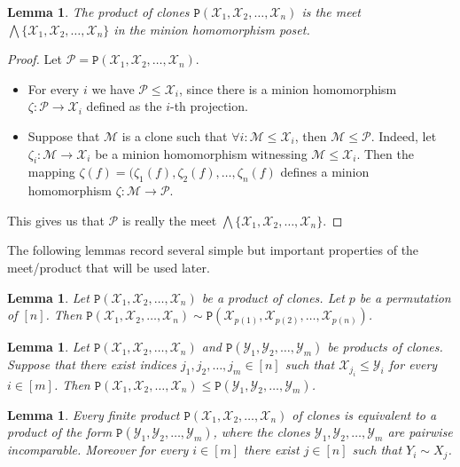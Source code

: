 \documentclass{amsart}
\numberwithin{equation}{section}
\theoremstyle{plain}
\newtheorem{lemma}[theorem]{Lemma}
\theoremstyle{definition}
\def\clone#1{\mathcal{#1}}
\def\C#1{{\mathtt{P}}(#1)}
\begin{document}
\begin{lemma}
The product of clones $\C{\clone{X}_1,\clone{X}_2,\dots, \clone{X}_n}$ is the meet $\bigwedge \{\clone{X}_1,\clone{X}_2,\dots,\clone{X}_n\}$ in the minion homomorphism poset. 
\end{lemma}
\begin{proof}
Let $\clone{P} = \C{\clone{X}_1,\clone{X}_2,\dots, \clone{X}_n}$.

\begin{itemize}
\item For every $i$ we have $\clone{P}\leq \clone{X}_i$, since there is a minion homomorphism $\zeta: \clone{P}\to \clone{X}_i$ defined as the $i$-th projection.
\item Suppose that $\clone{M}$ is a clone such that $\forall i:\clone{M} \leq \clone{X}_i$, then $\clone{M}\leq \clone{P}$. Indeed, let $\zeta_i:\clone{M}\to\clone{X}_i$ be a minion homomorphism witnessing $\clone{M}\leq \clone{X}_i$. Then the mapping $\zeta(f) = (\zeta_1(f), \zeta_2(f), \dots, \zeta_n(f)$ defines a minion homomorphism $\zeta:\clone{M}\to\clone{P}$.
\end{itemize}
This gives us that $\clone{P}$ is really the meet $\bigwedge \{\clone{X}_1,\clone{X}_2,\dots,\clone{X}_n\}$.
\end{proof}

The following lemmas record several simple but important properties of the meet/product that will be used later.

\begin{lemma}
\label{perm}
  Let $\C{\clone{X}_1,\clone{X}_2,\dots, \clone{X}_n}$ be a product of clones. Let $p$ be a permutation of $[n]$. Then $\C{\clone{X}_1,\clone{X}_2,\dots, \clone{X}_n}\sim\C{\clone{X}_{p(1)},\clone{X}_{p(2)},\dots,\clone{X}_{p(n)}}$.
\end{lemma}

\begin{lemma}
  \label{ineq-triv}
  Let $\C{\clone{X}_1,\clone{X}_2,\dots,\clone{X}_n}$ and $\C{\clone{Y}_1,\clone{Y}_2,\dots,\clone{Y}_m}$ be products of clones. Suppose that there exist indices $j_1,j_2,\dots,j_m\in[n]$ such that $\clone{X}_{j_i}\leq \clone{Y}_i$ for every $i\in[m]$. Then $\C{\clone{X}_1,\clone{X}_2,\dots,\clone{X}_n}\leq \C{\clone{Y}_1,\clone{Y}_2,\dots,\clone{Y}_m}$.
\end{lemma}

\begin{lemma}
  \label{incomparable-prod}
  Every finite product $\C{\clone{X}_1,\clone{X}_2,\dots,\clone{X}_n}$ of clones is equivalent to a product of the form $\C{\clone{Y}_1,\clone{Y}_2,\dots,\clone{Y}_m}$, where the clones $\clone{Y}_1, \clone{Y}_2, \dots, \clone{Y}_m$ are pairwise incomparable. Moreover for every $i\in[m]$ there exist $j\in[n]$ such that $Y_i\sim X_j$.
\end{lemma}
\end{document}

